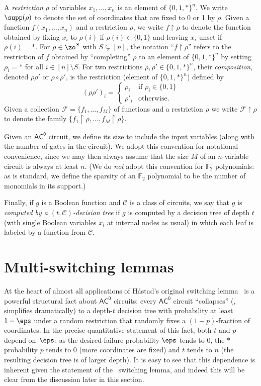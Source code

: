 \documentclass{toc}
\theoremstyle{plain}
\newcommand{\acz}{\mathsf{AC^0}}
\newcommand{\uhr}{\upharpoonright}
\renewcommand{\F}{\mathds{F}}
\begin{document}
A \emph{restriction} $\rho$ of variables $x_1,\dots,x_n$ is an element of $\{0,1,\ast\}^n$. We write $\supp(\rho)$ to denote the set of coordinates that are fixed to 0 or 1 by $\rho$.
Given a function $f(x_1,\dots,x_n)$ and a restriction $\rho$, we write $f \uhr \rho$ to denote the function obtained by fixing $x_i$ to $\rho(i)$ if $\rho(i) \in \{0,1\}$ and leaving $x_i$ unset if $\rho(i)=\ast.$
For $\rho \in \zo^{S}$ with $S \subsetneq [n]$,  the notation ``$f \uhr \rho$'' refers to the restriction of $f$ obtained by ``completing'' $\rho$ to an element of $\{0,1,\ast\}^n$ by setting $\rho_i=\ast$ for all $i \in [n]\setminus S.$
 For two restrictions $\rho,\rho'\in \{0,1,\ast\}^{n}$, their \emph{composition}, denoted $\rho\rho'$ or $\rho \circ \rho'$, is the restriction (element of $\{0,1,\ast\}^{n}$) defined by
\[ (\rho\rho')_i = \left\{
\begin{array}{cl}
\rho_i & \text{if $\rho_i \in \{0,1\}$} \\
\rho'_i & \text{otherwise.}
\end{array}
\right.\]
Given a collection $\mathscr{F} = \{f_1,\ldots,f_M\}$ of functions and a restriction $\rho$ we write $\mathscr{F} \uhr \rho$ to denote the family $\{f_1 \uhr \rho,\ldots,f_M\uhr\rho\}$. 

Given an $\acz$ circuit, we define its size to include the input variables (along with the number of gates in the circuit). We adopt this convention for notational convenience, since we may then always assume that the size $M$ of an $n$-variable circuit is always at least $n$. (We do \emph{not} adopt this convention for $\F_2$ polynomials: as is standard, we define the sparsity of an $\F_2$ polynomial to be the number of monomials in its support.)

Finally, if $g$ is a Boolean function and $\mathscr{C}$ is a class of circuits, we say that
$g$ is \emph{computed by a $(t,\mathscr{C})$-decision tree} if $g$ is computed by a decision tree of depth $t$ (with single Boolean 
variables $x_i$ at internal nodes as usual) in which each leaf is labeled by a function from $\mathscr{C}.$

\section{Multi-switching lemmas} \label{sec:hastad-vs-hastad}

At the heart of almost all applications of H{\aa}stad's original switching lemma~\cite{Hastad86} is a powerful structural fact about $\acz$ circuits: every $\acz$ circuit ``collapses'' (\ie, simplifies dramatically) to a depth-$t$ decision tree with probability at least $1-\eps$ under a random restriction that randomly fixes a $(1-p)$-fraction of coordinates.  In the precise quantitative statement of this fact, both $t$ and $p$ depend on~$\eps$: as the desired failure probability $\eps$ tends to $0$, the $\ast$-probability $p$ tends to $0$ (more coordinates are fixed) and $t$ tends to $n$ (the resulting decision tree is of larger depth). It is easy to see that this dependence is inherent given the statement of the~\cite{Hastad86} switching lemma, and indeed this will be clear from the discussion later in this section.
\end{document}
